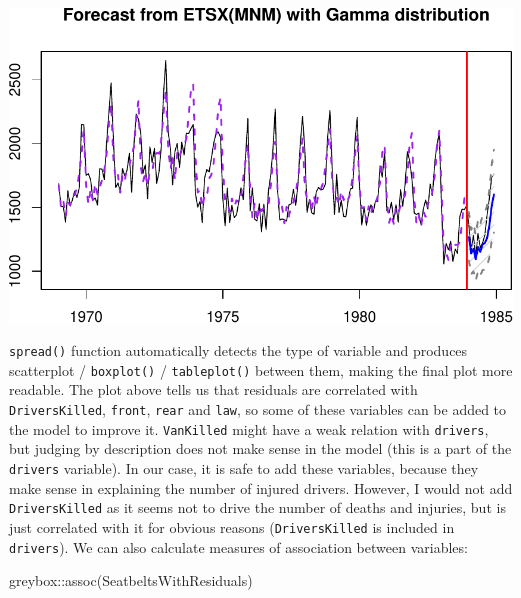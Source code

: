 \documentclass[
]{book}
\newenvironment{Shaded}{\begin{snugshade}}{\end{snugshade}}
\newcommand{\FunctionTok}[1]{\textcolor[rgb]{0.00,0.00,0.00}{#1}}
\newcommand{\NormalTok}[1]{#1}
\newcommand{\SpecialCharTok}[1]{\textcolor[rgb]{0.00,0.00,0.00}{#1}}
\theoremstyle{definition}
\theoremstyle{definition}
\theoremstyle{definition}
\theoremstyle{definition}
\theoremstyle{remark}
\begin{document}
\includegraphics{adam_files/figure-latex/unnamed-chunk-123-1.pdf}

\texttt{spread()} function automatically detects the type of variable and produces scatterplot / \texttt{boxplot()} / \texttt{tableplot()} between them, making the final plot more readable. The plot above tells us that residuals are correlated with \texttt{DriversKilled}, \texttt{front}, \texttt{rear} and \texttt{law}, so some of these variables can be added to the model to improve it. \texttt{VanKilled} might have a weak relation with \texttt{drivers}, but judging by description does not make sense in the model (this is a part of the \texttt{drivers} variable). In our case, it is safe to add these variables, because they make sense in explaining the number of injured drivers. However, I would not add \texttt{DriversKilled} as it seems not to drive the number of deaths and injuries, but is just correlated with it for obvious reasons (\texttt{DriversKilled} is included in \texttt{drivers}). We can also calculate measures of association between variables:

\begin{Shaded}
\begin{Highlighting}[]
\NormalTok{greybox}\SpecialCharTok{::}\FunctionTok{assoc}\NormalTok{(SeatbeltsWithResiduals)}
\end{Highlighting}
\end{Shaded}
\end{document}

